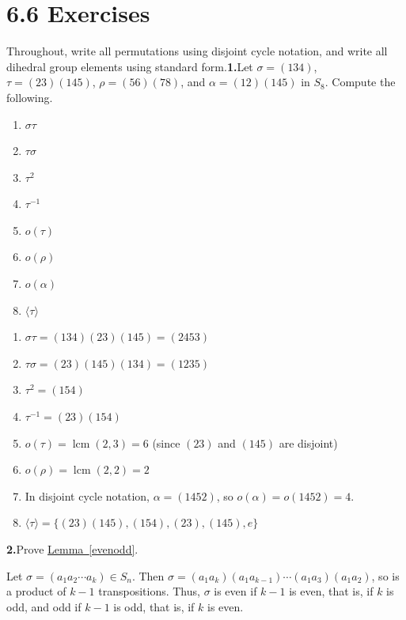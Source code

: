 \documentclass[10pt,]{book}
\theoremstyle{plain}
\theoremstyle{definition}
\theoremstyle{definition}
\theoremstyle{definition}
\theoremstyle{definition}
\numberwithin{equation}{section}
\DeclareMathOperator{\lcm}{lcm}
\begin{document}
\section*{6.6 Exercises}

Throughout, write all permutations using disjoint cycle notation, and write all dihedral group elements using standard form.\noindent\textbf{1.}\quad{}Let \(\sigma=(134)\), \(\tau=(23)(145)\), \(\rho=(56)(78)\), and \(\alpha=(12)(145)\) in \(S_8\). Compute the following. \leavevmode%
\begin{enumerate}[label=(\alph*)]
\item\hypertarget{li-351}{}\(\sigma \tau\)%
\item\hypertarget{li-352}{}\(\tau \sigma\)%
\item\hypertarget{li-353}{}\(\tau^2\)%
\item\hypertarget{li-354}{}\(\tau^{-1}\)%
\item\hypertarget{li-355}{}\(o(\tau)\)%
\item\hypertarget{li-356}{}\(o(\rho)\)%
\item\hypertarget{li-357}{}\(o(\alpha)\)%
\item\hypertarget{li-358}{}\(\langle \tau\rangle\)%
\end{enumerate}
%
\par\smallskip
\leavevmode%
\begin{enumerate}[label=(\alph*)]
\item\hypertarget{li-359}{}\(\sigma \tau= (134)(23)(145)=(2453)\)%
\item\hypertarget{li-360}{}\(\tau \sigma=  (23)(145)(134)=(1235)\)%
\item\hypertarget{li-361}{}\(\tau^2=(154)\)%
\item\hypertarget{li-362}{}\(\tau^{-1}=(23)(154)\)%
\item\hypertarget{li-363}{}\(o(\tau)=\lcm(2,3)=6\) (since \((23)\) and \((145)\) are disjoint)%
\item\hypertarget{li-364}{}\(o(\rho)=\lcm(2,2)=2\)%
\item\hypertarget{li-365}{}In disjoint cycle notation, \(\alpha=(1452)\), so \(o(\alpha)=o(1452)=4\).%
\item\hypertarget{li-366}{}\(\langle \tau\rangle =\{(23)(145), (154), (23), (145), e\}\)%
\end{enumerate}
\par\smallskip
\noindent\textbf{2.}\quad{}Prove \hyperref[evenodd]{Lemma~\ref{evenodd}}.%
\par\smallskip
Let \(\sigma=(a_1a_2\cdots a_k)\in S_n\). Then \(\sigma=(a_1a_k)(a_1a_{k-1})\cdots (a_1a_3)(a_1a_2)\), so is a product of \(k-1\) transpositions. Thus, \(\sigma\) is even if \(k-1\) is even, that is, if \(k\) is odd, and odd if \(k-1\) is odd, that is, if \(k\) is even.%
\end{document}

